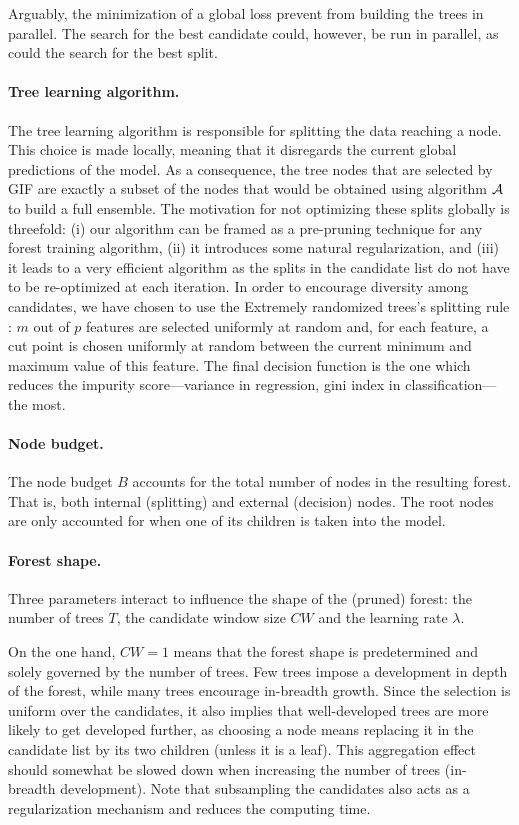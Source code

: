 \documentclass{article}
\begin{document}
Arguably, the minimization of a global loss prevent from building the trees in 
parallel. The search for the best candidate could, however, be run in parallel, 
as could the search for the best split. 

\paragraph{Tree learning algorithm.}
The tree learning algorithm is responsible for splitting the data
reaching a node. This choice is made locally, meaning that it
disregards the current global predictions of the model. As a
consequence, the tree nodes that are selected by GIF are exactly a
subset of the nodes that would be obtained using algorithm ${\cal A}$
to build a full ensemble. The motivation for not optimizing these
splits globally is threefold: (i) our algorithm can be framed as a
pre-pruning technique for any forest training algorithm, (ii) it
introduces some natural regularization, and (iii) it leads to a very
efficient algorithm as the splits in the candidate list do not have to
be re-optimized at each iteration. In order to encourage diversity
among candidates, we have chosen to use the Extremely randomized
trees's splitting rule \cite{extratrees}: $m$ out of $p$ features are
selected uniformly at random and, for each feature, a cut point is
chosen uniformly at random between the current minimum and maximum
value of this feature. The final decision function is the one which
reduces the impurity score---variance in regression, gini index in
classification---the most.

\paragraph{Node budget.}
The node budget $B$ accounts for the total number of nodes in the resulting 
forest. That is, both internal (splitting) and external (decision) nodes. The 
root nodes are only accounted for when one of its children is taken into the 
model.

\paragraph{Forest shape.}
Three parameters interact to influence the shape of the (pruned)
forest: the number of trees $T$, the candidate window size $CW$ and
the learning rate $\lambda$.

On the one hand, $CW=1$ means that the forest shape is predetermined and 
solely governed by the number of trees. Few trees impose a development in 
depth of the forest, while many trees encourage in-breadth growth. Since the 
selection is uniform over the candidates, it also implies that well-developed 
trees are more likely to get developed further, as choosing a node means 
replacing it in the candidate list by its two children (unless it is a leaf). 
This aggregation effect should somewhat be slowed down when increasing the 
number of trees (in-breadth development). Note that subsampling the candidates 
also acts as a regularization mechanism and reduces the computing time.
\end{document}
